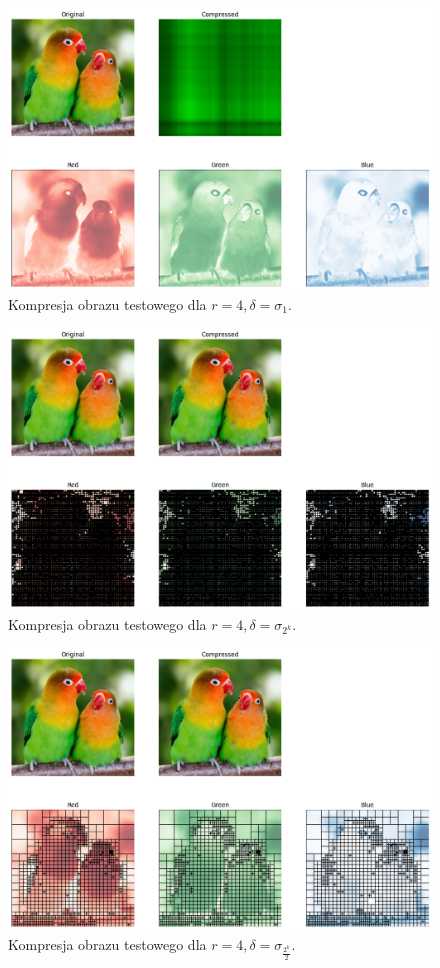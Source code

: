 \documentclass[11pt, leqno]{scrartcl}
\begin{document}
    \begin{figure}[H]
        \centering
        \includegraphics[width=0.9\linewidth]{r4sigma1.png}
        \caption{Kompresja obrazu testowego dla $r=4,\delta =\sigma_1$.}
    \end{figure}
    \begin{figure}[H]
        \centering
        \includegraphics[width=0.9\linewidth]{r4sigma2k.png}
        \caption{Kompresja obrazu testowego dla $r=4,\delta =\sigma_{2^k}$.}
    \end{figure}
    \begin{figure}[H]
        \centering
        \includegraphics[width=0.9\linewidth]{r4sigma05k.png}
        \caption{Kompresja obrazu testowego dla $r=4,\delta =\sigma_\frac{2^k}{2}$.}
    \end{figure}
\end{document}
